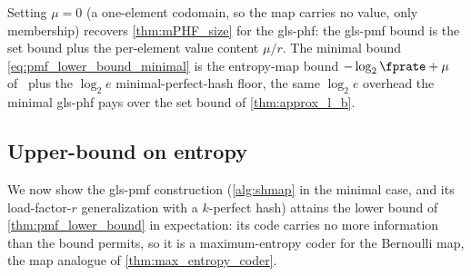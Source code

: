\documentclass[ ../main.tex]{subfiles}
\begin{document}
\begin{remark}
\label{rem:pmf_specializes}
Setting $\mu = 0$ (a one-element codomain, so the map carries no value, only membership) recovers \cref{thm:mPHF_size} for the \gls{gls-phf}: the \gls{gls-pmf} bound is the set bound plus the per-element value content $\mu/r$. The minimal bound \cref{eq:pmf_lower_bound_minimal} is the entropy-map bound $-\log_2\fprate + \mu$ of~\cite{bmaps} plus the $\log_2 e$ minimal-perfect-hash floor, the same $\log_2 e$ overhead the minimal \gls{gls-phf} pays over the set bound of \cref{thm:approx_l_b}.
\end{remark}

\subsection{Upper-bound on entropy}
\label{sec:pmf_entropy}
We now show the \gls{gls-pmf} construction (\cref{alg:shmap} in the minimal case, and its load-factor-$r$ generalization with a $k$-perfect hash) attains the lower bound of \cref{thm:pmf_lower_bound} in expectation: its code carries no more information than the bound permits, so it is a maximum-entropy coder for the Bernoulli map, the map analogue of \cref{thm:max_entropy_coder}.
\end{document}
